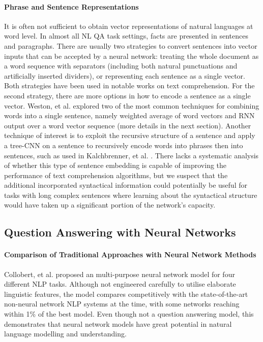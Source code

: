 \documentclass[]{article}
\begin{document}
\paragraph{Phrase and Sentence Representations}
It is often not sufficient to obtain vector representations of natural languages at word level. In almost all NL QA task settings, facts are presented in sentences and paragraphs. There are usually two strategies to convert sentences into vector inputs that can be accepted by a neural network: treating the whole document as a word sequence with separators (including both natural punctuations and artificially inserted dividers), or representing each sentence as a single vector. Both strategies have been used in notable works on text comprehension. For the second strategy, there are more options in how to encode a sentence as a single vector. Weston, et al. \cite{weston2014memory} explored two of the most common techniques for combining words into a single sentence, namely weighted average of word vectors and RNN output over a word vector sequence (more details in the next section).  
Another technique of interest is to exploit the recursive structure of a sentence and apply a tree-CNN on a sentence to recursively encode words into phrases then into sentences, such as used in Kalchbrenner, et al. \cite{kalchbrenner2014convolutional}. There lacks a systematic analysis of whether this type of sentence embedding is capable of improving the performance of text comprehension algorithms, but we suspect that the additional incorporated syntactical information could potentially be useful for tasks with long complex sentences where learning about the syntactical structure would have taken up a significant portion of the network’s capacity. 

\subsection{Question Answering with Neural Networks}

\paragraph{Comparison of Traditional Approaches with Neural Network Methods}
Collobert, et al. \cite{collobert2011natural} proposed an multi-purpose neural network model for four different NLP tasks. Although not engineered carefully to utilise elaborate linguistic features, the model compares competitively with the state-of-the-art non-neural network NLP systems at the time, with some networks reaching within 1\% of the best model. Even though not a question answering model, this demonstrates that neural network models have great potential in natural language modelling and understanding.
\end{document}
